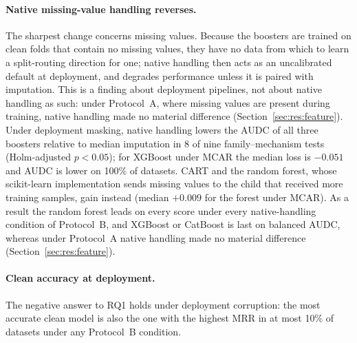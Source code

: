 \documentclass[pdflatex,sn-mathphys]{sn-jnl}
\theoremstyle{thmstyleone}
\theoremstyle{thmstyletwo}
\theoremstyle{thmstylethree}
\begin{document}
\paragraph{Native missing-value handling reverses.} The sharpest change concerns missing values. Because the boosters are trained on clean folds that contain no missing values, they have no data from which to learn a split-routing direction for one; native handling then acts as an uncalibrated default at deployment, and degrades performance unless it is paired with imputation. This is a finding about deployment pipelines, not about native handling as such: under Protocol~A, where missing values are present during training, native handling made no material difference (Section~\ref{sec:res:feature}). Under deployment masking, native handling lowers the AUDC of all three boosters relative to median imputation in 8 of nine family--mechanism tests (Holm-adjusted $p<0.05$); for XGBoost under MCAR the median loss is $-0.051$ and AUDC is lower on 100\% of datasets. CART and the random forest, whose scikit-learn implementation sends missing values to the child that received more training samples, gain instead (median $+0.009$ for the forest under MCAR). As a result the random forest leads on every score under every native-handling condition of Protocol~B, and XGBoost or CatBoost is last on balanced AUDC, whereas under Protocol~A native handling made no material difference (Section~\ref{sec:res:feature}).

\paragraph{Clean accuracy at deployment.} The negative answer to RQ1 holds under deployment corruption: the most accurate clean model is also the one with the highest MRR in at most 10\% of datasets under any Protocol~B condition.
\end{document}
